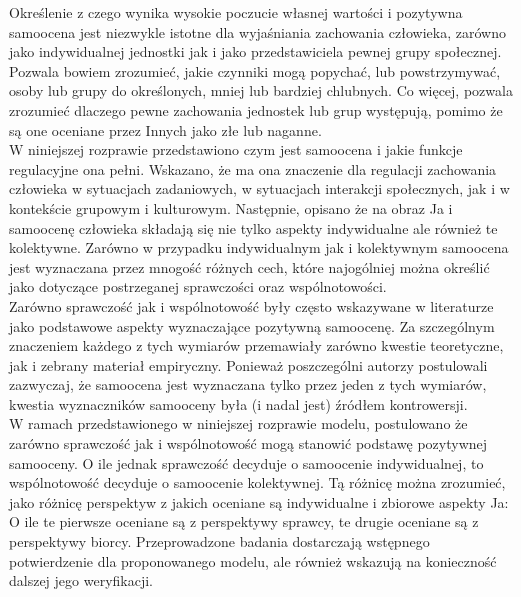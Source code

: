 \documentclass[man]{apa6}
\begin{document}
Określenie z czego wynika wysokie poczucie własnej wartości i pozytywna samoocena jest niezwykle istotne dla wyjaśniania zachowania człowieka, zarówno jako indywidualnej jednostki jak i jako przedstawiciela pewnej grupy społecznej. Pozwala bowiem zrozumieć, jakie czynniki mogą popychać, lub powstrzymywać, osoby lub grupy do określonych, mniej lub bardziej chlubnych. Co więcej, pozwala zrozumieć dlaczego pewne zachowania jednostek lub grup występują, pomimo że są one oceniane przez Innych jako złe lub naganne.\\

W niniejszej rozprawie przedstawiono czym jest samoocena i jakie funkcje regulacyjne ona pełni. Wskazano, że ma ona znaczenie dla regulacji zachowania człowieka w sytuacjach zadaniowych, w sytuacjach interakcji społecznych, jak i w kontekście grupowym i kulturowym. Następnie, opisano że na obraz Ja i samoocenę człowieka składają się nie tylko aspekty indywidualne ale również te kolektywne. Zarówno w przypadku indywidualnym jak i kolektywnym samoocena jest wyznaczana przez mnogość różnych cech, które najogólniej można określić jako dotyczące postrzeganej sprawczości oraz wspólnotowości.\\

Zarówno sprawczość jak i wspólnotowość były często wskazywane w literaturze jako podstawowe aspekty wyznaczające pozytywną samoocenę. Za szczególnym znaczeniem każdego z tych wymiarów przemawiały zarówno kwestie teoretyczne, jak i zebrany materiał empiryczny. Ponieważ poszczególni autorzy postulowali zazwyczaj, że samoocena jest wyznaczana tylko przez jeden z tych wymiarów, kwestia wyznaczników samooceny była (i nadal jest) źródłem kontrowersji.\\

W ramach przedstawionego w niniejszej rozprawie modelu, postulowano że zarówno sprawczość jak i wspólnotowość mogą stanowić podstawę pozytywnej samooceny. O ile jednak sprawczość decyduje o samoocenie indywidualnej, to wspólnotowość decyduje o samoocenie kolektywnej. Tą różnicę można zrozumieć, jako różnicę perspektyw z jakich oceniane są indywidualne i zbiorowe aspekty Ja: O ile te pierwsze oceniane są z perspektywy sprawcy, te drugie oceniane są z perspektywy biorcy. Przeprowadzone badania dostarczają wstępnego potwierdzenie dla proponowanego modelu, ale również wskazują na konieczność dalszej jego weryfikacji.\\


\printbibliography
\end{document}

